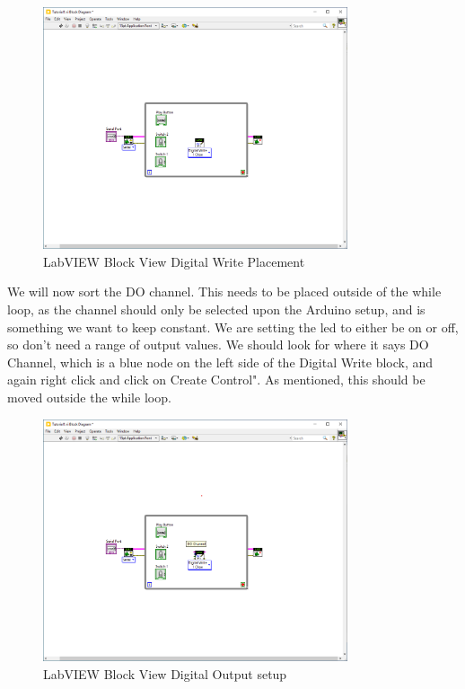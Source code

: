 \documentclass[a4paper,11pt]{report}
\begin{document}
\begin{figure}[H]
\centering
\includegraphics[width=0.8\textwidth]{screenshots/labview19}
\caption{LabVIEW Block View Digital Write Placement}
\end{figure}

We will now sort the DO channel. This needs to be placed outside of the while loop, as the channel should only be selected upon the Arduino setup, and is something we want to keep constant. We are setting the \gls{led} to either be on or off, so don't need a range of output values. We should look for where it says DO Channel, which is a blue node on the left side of the Digital Write block, and again right click and click on Create Control". As mentioned, this should be moved outside the while loop.

\begin{figure}[H]
\centering
\includegraphics[width=0.8\textwidth]{screenshots/labview20}
\caption{LabVIEW Block View Digital Output setup}
\end{figure}
\end{document}
